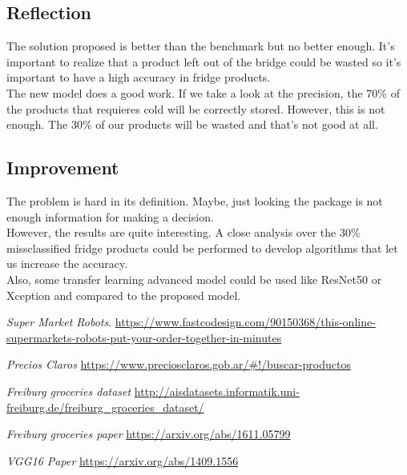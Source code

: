 \documentclass[a4paper,10pt]{article}
\begin{document}
\newpage


\subsection{Reflection}


The solution proposed is better than the benchmark but no better enough. It's important to realize that a product left out of the bridge could be wasted so it's important to have a high accuracy in fridge products. \\

The new model does a good work. If we take a look at the precision, the 70\% of the products that requieres cold will be correctly stored. However, this is not enough. The 30\% of our products will be wasted and that's not good at all. \\


\subsection{Improvement}

The problem is hard in its definition. Maybe, just looking the package is not enough information for making a decision. \\

However, the results are quite interesting. A close analysis over the 30\% missclassified fridge products could be performed to develop algorithms that let us increase the accuracy. \\

Also, some transfer learning advanced model could be used like ResNet50 or Xception and compared to the proposed model. 

\begin{thebibliography}{9}
\textit{Super Market Robots}. 
\url{https://www.fastcodesign.com/90150368/this-online-supermarkets-robots-put-your-order-together-in-minutes} 

\textit{Precios Claros} 
\url{https://www.preciosclaros.gob.ar/\#!/buscar-productos}
 
\textit{Freiburg groceries dataset} 
\url{http://aisdatasets.informatik.uni-freiburg.de/freiburg\_groceries\_dataset/}

\textit{Freiburg groceries paper}
\url{https://arxiv.org/abs/1611.05799} 

\textit{VGG16 Paper}
\url{https://arxiv.org/abs/1409.1556}


\end{thebibliography}
 
\end{document}
